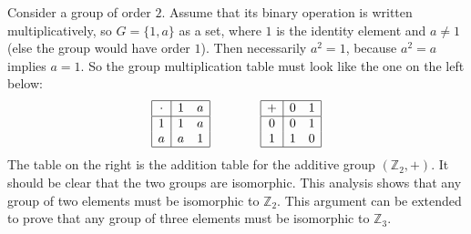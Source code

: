 \documentclass[11pt]{article}
\theoremstyle{definition}
\newcommand{\Z}{\mathbb{Z}} %
\begin{document}
Consider a group of order $2$. Assume that its binary operation is
written multiplicatively, so $G = \{1, a\}$ as a set, where $1$ is the
identity element and $a \ne 1$ (else the group would have order
$1$). Then necessarily $a^2=1$, because $a^2=a$ implies $a=1$. So the
group multiplication table must look like the one on the left below:
\[
\begin{array}{|c|cc|} \hline
\cdot&1&a\\ \hline 
1&1&a\\
a&a&1\\
\hline
\end{array}
\qquad \qquad
\begin{array}{|c|cc|} \hline
+&0&1\\ \hline 
0&0&1\\
1&1&0\\
\hline
\end{array}
\]
The table on the right is the addition table for the additive group
$(\Z_2,+)$. It should be clear that the two groups are
isomorphic. This analysis shows that any group of two elements must be
isomorphic to $\Z_2$. This argument can be extended to prove that any
group of three elements must be isomorphic to $\Z_3$.


\end{document}
